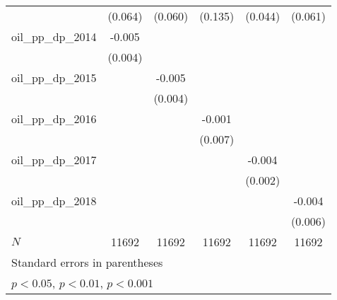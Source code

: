 {\begin{tabular}{l*{5}{c}}
            &     (0.064)         &     (0.060)         &     (0.135)         &     (0.044)         &     (0.061)         \\
[1em]
oil\_pp\_dp\_2014&      -0.005         &                     &                     &                     &                     \\
            &     (0.004)         &                     &                     &                     &                     \\
[1em]
oil\_pp\_dp\_2015&                     &      -0.005         &                     &                     &                     \\
            &                     &     (0.004)         &                     &                     &                     \\
[1em]
oil\_pp\_dp\_2016&                     &                     &      -0.001         &                     &                     \\
            &                     &                     &     (0.007)         &                     &                     \\
[1em]
oil\_pp\_dp\_2017&                     &                     &                     &      -0.004         &                     \\
            &                     &                     &                     &     (0.002)         &                     \\
[1em]
oil\_pp\_dp\_2018&                     &                     &                     &                     &      -0.004         \\
            &                     &                     &                     &                     &     (0.006)         \\
\hline
\(N\)       &       11692         &       11692         &       11692         &       11692         &       11692         \\
\hline\hline
\multicolumn{6}{l}{\footnotesize Standard errors in parentheses}\\
\multicolumn{6}{l}{\footnotesize \sym{*} \(p<0.05\), \sym{**} \(p<0.01\), \sym{***} \(p<0.001\)}\\
\end{tabular}
}
